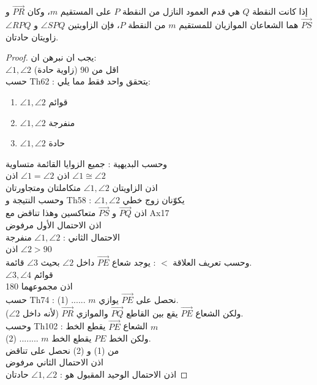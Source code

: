 \begin{theorem}
	إذا كانت النقطة $Q$ هي قدم العمود النازل من النقطة $P$ على المستقيم $m$، وكان $\overrightarrow{PR}$ و $\overrightarrow{PS}$ هما الشعاعان الموازيان للمستقيم $m$ من النقطة $P$، فإن الزاويتين $\angle SPQ$ و $\angle RPQ$ زاويتان حادتان.
\end{theorem}
\begin{proof}
يجب ان نبرهن ان:\\
$\angle 1, \angle 2$ اقل من 90 (زاوية حادة)\\
حسب Th62 : يتحقق واحد فقط مما يلي:
\begin{enumerate}
	\item $\angle 1, \angle 2$ قوائم
	\item $\angle 1, \angle 2$ منفرجة
	\item $\angle 1, \angle 2$ حادة
\end{enumerate}
وحسب البديهية : جميع الزوايا القائمة متساوية\\
اذن 
$\angle 1 = \angle 2$ اذن $\angle 1  \cong \angle 2$\\
اذن الزاويتان 
$\angle 1, \angle 2$ متكاملتان ومتجاورتان\\
وحسب النتيجة و Th58 : $\angle 1, \angle 2$ يكوّنان زوج خطي\\
اذن $\overrightarrow{PQ}$ و $\overrightarrow{PS}$ متعاكسين وهذا تناقض مع Ax17\\
اذن الاحتمال الأول مرفوض\\
الاحتمال الثاني : $\angle 1, \angle 2$ منفرجة\\
اذن 
$\angle 2  > 90$\\
وحسب تعريف العلاقة $<$ : يوجد شعاع $\overrightarrow{PE}$ داخل $\angle 2$ بحيث $\angle 3$ قائمة.\\
$\angle 3, \angle 4$ قوائم\\
اذن مجموعهما 180\\
حسب Th74 : نحصل على $\overrightarrow{PE}$ يوازي $m$ ...... (1).\\
ولكن الشعاع $\overrightarrow{PE}$ يقع بين القاطع $\overrightarrow{PQ}$ والموازي $\overrightarrow{PR}$ (لأنه داخل $\angle 2 $).\\
وحسب Th102 : الشعاع $\overrightarrow{PE}$ يقطع الخط $m$\\
ولكن الخط $PE$ يقطع الخط $m$ ........ (2).\\
من (1) و (2) نحصل على تناقض\\
اذن الاحتمال الثاني مرفوض\\
اذن الاحتمال الوحيد المقبول هو : 
$\angle 1, \angle 2$ حادتان
 \end{proof}

